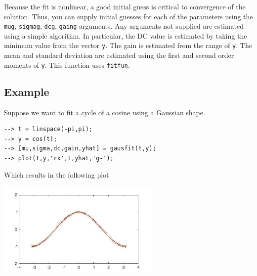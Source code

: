 Because the fit is nonlinear, a good initial guess is critical to
convergence of the solution.  Thus, you can supply initial guesses
for each of the parameters using the \verb|mug|, \verb|sigmag|, \verb|dcg|, 
\verb|gaing| arguments.  Any arguments not supplied are estimated using 
a simple algorithm. In particular, the DC value is estimated by 
taking the minimum value  from the vector \verb|y|.  The gain is 
estimated from the range of \verb|y|.  The mean and standard deviation 
are estimated using the first and second order moments of \verb|y|.
This function uses \verb|fitfun|.
\subsection{Example}

Suppose we want to fit a cycle of a cosine using a Gaussian shape.
\begin{verbatim}
--> t = linspace(-pi,pi); 
--> y = cos(t);
--> [mu,sigma,dc,gain,yhat] = gausfit(t,y);
--> plot(t,y,'rx',t,yhat,'g-');
\end{verbatim}
Which results in the following plot


\centerline{\includegraphics[width=8cm]{gausfit1}}

